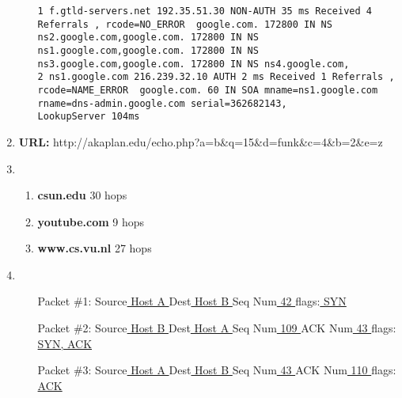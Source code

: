 \documentclass{article}
\begin{document}
\begin{enumerate}
\begin{enumerate}
\begin{lstlisting}
1 f.gtld-servers.net 192.35.51.30 NON-AUTH 35 ms Received 4 Referrals , rcode=NO_ERROR  google.com. 172800 IN NS ns2.google.com,google.com. 172800 IN NS ns1.google.com,google.com. 172800 IN NS ns3.google.com,google.com. 172800 IN NS ns4.google.com,
2 ns1.google.com 216.239.32.10 AUTH 2 ms Received 1 Referrals , rcode=NAME_ERROR  google.com. 60 IN SOA mname=ns1.google.com rname=dns-admin.google.com serial=362682143,
LookupServer 104ms
       \end{lstlisting}
    \end{enumerate}
    \item \textbf{URL:} http://akaplan.edu/echo.php?a=b\&q=15\&d=funk\&c=4\&b=2\&e=z
    \item \begin{enumerate}
        \item \textbf{csun.edu} 30 hops
        \item \textbf{youtube.com} 9 hops
        \item \textbf{www.cs.vu.nl} 27 hops
    \end{enumerate}
    \item \begin{enumerate}[leftmargin=0.8in]
        \item[Packet \#1:] Source\underline{ Host A } Dest\underline{ Host B } Seq Num\underline{ 42 } flags:\underline{ SYN }
        \item[Packet \#2:] Source\underline{ Host B } Dest\underline{ Host A } Seq Num\underline{ 109 } ACK Num\underline{ 43 } flags:\underline{ SYN, ACK } 
        \item[Packet \#3:] Source\underline{ Host A } Dest\underline{ Host B } Seq Num\underline{ 43 } ACK Num\underline{ 110 } flags:\underline{ ACK } 
    \end{enumerate}
\end{enumerate}
\end{document}
